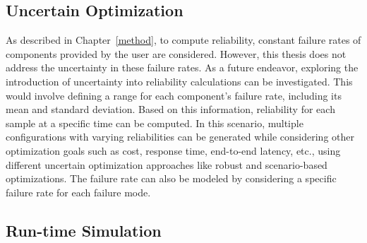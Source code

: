     \subsection{Uncertain Optimization}
    
    As described in Chapter~\ref{method}, to compute reliability, constant failure rates of components provided by the user are considered. However, this thesis does not address the uncertainty in these failure rates. As a future endeavor, exploring the introduction of uncertainty into reliability calculations can be investigated. This would involve defining a range for each component's failure rate, including its mean and standard deviation. Based on this information, reliability for each sample at a specific time can be computed.
    In this scenario, multiple configurations with varying reliabilities can be generated while considering other optimization goals such as cost, response time, end-to-end latency, etc., using different uncertain optimization approaches like robust and scenario-based optimizations. The failure rate can also be modeled by considering a specific failure rate for each failure mode.
    
    
    
    
    
    \subsection{Run-time Simulation}
     
